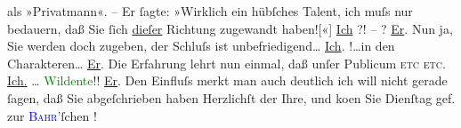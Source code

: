                   {\pb}als »Privatmann«. – Er ſagte: »Wirklich ein hübſches
               Talent, ich muſs nur bedauern, daß Sie ſich \uline{dieſer}
               Richtung zugewandt haben!{[}«{]}\pend
           \pstart
           \uline{Ich}{ }{\dotstwo}?{\dotsfour}! – ?\pend
           \pstart
           \uline{Er}. Nun ja, Sie werden doch zugeben, der Schluſs ist
                  unbefriedigend{\dots}\pend
           \pstart
           \uline{Ich}.{ }{\dotstwo}!{\dots}in den Charakteren{\dots}\pend
           \pstart
           \uline{Er}. Die Erfahrung lehrt nun einmal, daß unſer
               Publicum \textsc{etc etc}.\pend
           \pstart
           {\pb}\uline{Ich.}{ }{\dots}{ }\textcolor{green}{Wildente}{}\ledrightnote{\textcolor{green}{Die Wildente}}!!{\dotsfour}\pend
           \pstart
           \uline{Er}. Den Einfluſs merkt man auch deutlich {\dotstwo} ich will nicht gerade ſagen, daß Sie abgeſchrieben
                  haben{\dotsfour}\pend
           \pstart
           \label{T_L00090_1v}\label{T_L00090_1h}\pend
           \pstart
           Herzlichſt der Ihre, und ko{\geminationm}en Sie Dienſtag gef. zur \textcolor{blue}{\textsc{Bahr}}{}\ledrightnote{\textcolor{blue}{Hermann Bahr}}’ſchen \label{K_L00090_1v}\label{K_L00090_1h}!\pend
           \endnumbering{}  
      